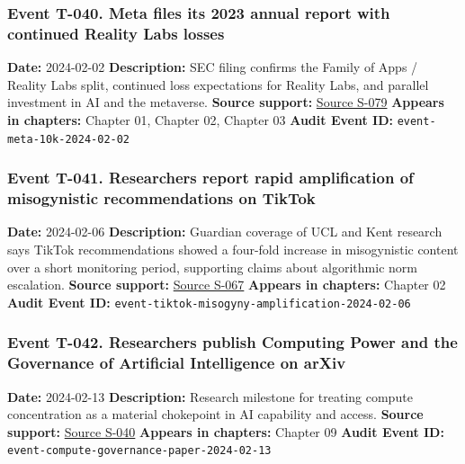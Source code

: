 \documentclass[
  american,
  11pt,
  letterpaper,
]{article}
\begin{document}
\subsubsection{Event T-040. Meta files its 2023 annual report with
continued Reality Labs
losses}\label{event-t-040-meta-files-its-2023-annual-report-with-continued-reality-labs-losses}

\textbf{Date:} 2024-02-02 \textbf{Description:} SEC filing confirms the
Family of Apps / Reality Labs split, continued loss expectations for
Reality Labs, and parallel investment in AI and the metaverse.
\textbf{Source support:}
\hyperref[source-s-079-meta-platforms-inc-2023-annual-report-form-10-k]{Source
S-079} \textbf{Appears in chapters:} Chapter 01, Chapter 02, Chapter 03
\textbf{Audit Event ID:} \texttt{event-meta-10k-2024-02-02}

\subsubsection{Event T-041. Researchers report rapid amplification of
misogynistic recommendations on
TikTok}\label{event-t-041-researchers-report-rapid-amplification-of-misogynistic-recommendations-on-tiktok}

\textbf{Date:} 2024-02-06 \textbf{Description:} Guardian coverage of UCL
and Kent research says TikTok recommendations showed a four-fold
increase in misogynistic content over a short monitoring period,
supporting claims about algorithmic norm escalation. \textbf{Source
support:}
\hyperref[source-s-067-social-media-algorithms-amplifying-misogynistic-content]{Source
S-067} \textbf{Appears in chapters:} Chapter 02 \textbf{Audit Event ID:}
\texttt{event-tiktok-misogyny-amplification-2024-02-06}

\subsubsection{Event T-042. Researchers publish Computing Power and the
Governance of Artificial Intelligence on
arXiv}\label{event-t-042-researchers-publish-computing-power-and-the-governance-of-artificial-intelligence-on-arxiv}

\textbf{Date:} 2024-02-13 \textbf{Description:} Research milestone for
treating compute concentration as a material chokepoint in AI capability
and access. \textbf{Source support:}
\hyperref[source-s-040-computing-power-and-the-governance-of-artificial-intelligence]{Source
S-040} \textbf{Appears in chapters:} Chapter 09 \textbf{Audit Event ID:}
\texttt{event-compute-governance-paper-2024-02-13}
\end{document}
